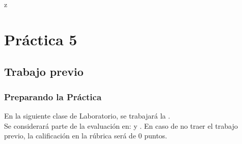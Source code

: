 z\documentclass[14pt]{beamer}
\begin{document}
\section{Práctica 5}
\subsection{Trabajo previo}

\begin{frame}
\frametitle{Preparando la Práctica}
En la siguiente clase de Laboratorio, se trabajará la .
\\
\bigskip
\pause
Se considerará parte de la evaluación en:  y . En caso de no traer el trabajo previo, la calificación en la rúbrica será de $0$ puntos.
\end{frame}
\end{document}

